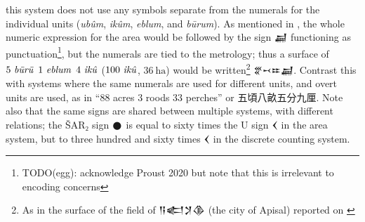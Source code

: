 \documentclass[10pt, a4paper, twoside]{article}
\begin{document}
this system does not use any symbols separate from the numerals
for the individual units (\emph{ubûm}, \emph{ikûm}, \emph{eblum}, and \emph{būrum}).
As mentioned in \cite{Robson2019}, the whole numeric expression for the area would be followed by the sign {\xsuxfont 𒃷}
functioning as punctuation\footnote{TODO(egg): acknowledge Proust 2020
  but note that this is irrelevant to encoding concerns}, but the numerals are tied to the metrology; thus
a surface of $5~\text{\emph{būrū}}$ $1~\text{\emph{eblum}}$ $4~\text{\emph{ikû}}$ ($100~\text{\emph{ikû}}$, $36~\text{ha}$) would be written\footnote{As in the surface of the field of {\xsuxfont 𒀀𒅗𒋡𒆠} (the city of Apisal) reported on \cite[r.~1]{P102305}}
{\xsuxfont 𒐐𒑘𒐂𒃷}. Contrast this with systems
where the same numerals are used for different units,
and overt units are used, as in ``$88$ acres $3$ roods $33$ perches'' or {\hantfont 五頃八畝五分九厘}.
Note also that the same signs are shared between multiple systems,
with different relations; the ŠAR₂ sign {\xsuxfont 𒊹} is equal to sixty times the U sign {\xsuxfont 𒌋}
in the area system, but to three hundred and sixty times {\xsuxfont 𒌋} in the discrete counting system.
\end{document}
